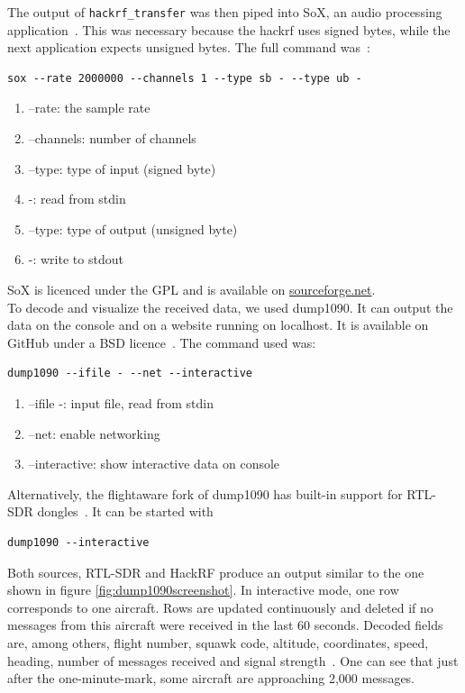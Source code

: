 \documentclass[conference]{IEEEtran}
\begin{document}
The output of \lstinline|hackrf_transfer| was then piped into SoX, an audio processing application~\cite{SoX19}. This was necessary because the hackrf uses signed bytes, while the next application expects unsigned bytes. The full command was~\cite{Medium19ADS-B}:
\begin{lstlisting}
sox --rate 2000000 --channels 1 --type sb - --type ub -
\end{lstlisting}
\begin{enumerate}
	\item --rate: the sample rate
	\item --channels: number of channels
	\item --type: type of input (signed byte)
	\item -: read from stdin
	\item --type: type of output (unsigned byte)
	\item -: write to stdout
\end{enumerate}
SoX is licenced under the GPL and is available on \url{sourceforge.net}.\\
To decode and visualize the received data, we used dump1090. It can output the data on the console and on a website running on localhost. It is available on GitHub under a BSD licence~\cite{dump109019Github}. The command used was:
\begin{lstlisting}
dump1090 --ifile - --net --interactive
\end{lstlisting}
\begin{enumerate}
	\item --ifile -: input file, read from stdin
	\item --net: enable networking
	\item --interactive: show interactive data on console
\end{enumerate}
Alternatively, the flightaware fork of dump1090 has built-in support for RTL-SDR dongles~\cite{Github19dump1090-fa}. It can be started with
\begin{lstlisting}
dump1090 --interactive
\end{lstlisting}
Both sources, RTL-SDR and HackRF produce an output similar to the one shown in figure \ref{fig:dump1090screenshot}. In interactive mode, one row corresponds to one aircraft. Rows are updated continuously and deleted if no messages from this aircraft were received in the last 60 seconds. Decoded fields are, among others, flight number, squawk code, altitude, coordinates, speed, heading, number of messages received and signal strength~\cite{dump109019Github}. One can see that just after the one-minute-mark, some aircraft are approaching 2,000 messages. 
\end{document}
